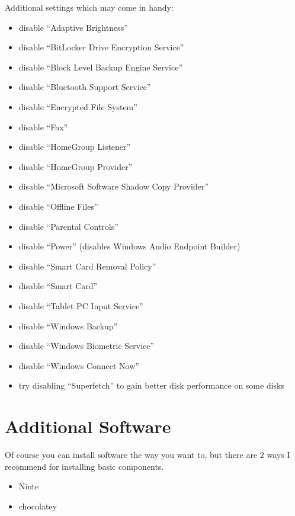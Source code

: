 \documentclass{itsarticle}
\begin{document}
Additional settings which may come in handy:

\begin{itemize}
    \item disable ``Adaptive Brightness''
    \item disable ``BitLocker Drive Encryption Service''
    \item disable ``Block Level Backup Engine Service''
    \item disable ``Bluetooth Support Service''
    \item disable ``Encrypted File System''
    \item disable ``Fax''
    \item disable ``HomeGroup Listener''
    \item disable ``HomeGroup Provider''
    \item disable ``Microsoft Software Shadow Copy Provider''
    \item disable ``Offline Files''
    \item disable ``Parental Controls''
    \item disable ``Power'' (disables Windows Audio Endpoint Builder)
    \item disable ``Smart Card Removal Policy''
    \item disable ``Smart Card''
    \item disable ``Tablet PC Input Service''
    \item disable ``Windows Backup''
    \item disable ``Windows Biometric Service''
    \item disable ``Windows Connect Now''
    \item try disabling ``Superfetch'' to gain better disk performance on some
        disks
\end{itemize}

\section{Additional Software}
\label{sec:software}

Of course you can install software the way you want to, but there are 2 ways I
recommend for installing basic components.

\begin{itemize}
    \item Ninte\footnotemark
    \item chocolatey\footnotemark
\end{itemize}
\end{document}
